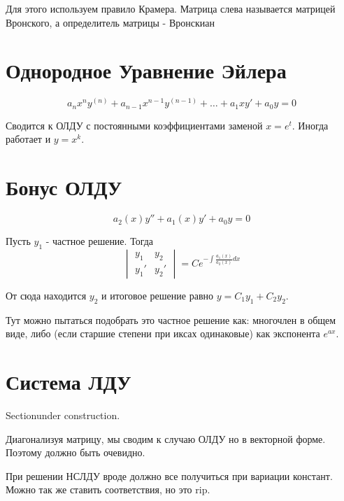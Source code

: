 \documentclass[11pt]{article}
\begin{document}
\begin{enumerate}
\begin{itemize}
				Для этого используем правило Крамера. Матрица слева называется матрицей Вронского, а определитель матрицы - Вронскиан
			\end{itemize}
		
	\end{enumerate}


	\section{Однородное Уравнение Эйлера}
	$$a_{n}x^n y^{(n)} +a_{n-1}x^{n-1} y^{(n-1)} + \dots + a_{1} xy' + a_{0} y = 0 $$
	
	Сводится к ОЛДУ с постоянными коэффициентами заменой $x = e^t$. Иногда работает и $y = x^k$.
	

	\section{Бонус ОЛДУ}
	
	$$a_2(x) y'' + a_1(x)y' + a_0 y = 0$$
	
	Пусть $y_1$ - частное решение. Тогда
	$$
	\begin{vmatrix}
	y_1 & y_2\\
	y_1' & y_2'
	\end{vmatrix} = C e^{-\int \frac{a_1(x)}{a_2(x)}dx }
	$$
	
	От сюда находится $y_2$ и итоговое решение равно $y = C_1 y_1 + C_2 y_2$. 
	
	Тут можно пытаться подобрать это частное решение как: многочлен в общем виде, либо (если старшие степени при иксах одинаковые) как экспонента $e^{ax}$.

	\section{Система ЛДУ}

Sectionunder construction.
	
	Диагонализуя матрицу, мы сводим к случаю ОЛДУ но в векторной форме. Поэтому должно быть очевидно.
	
	При решении НСЛДУ вроде должно все получиться при вариации констант. Можно так же ставить соответствия, но это rip.
	
	
\end{document}
